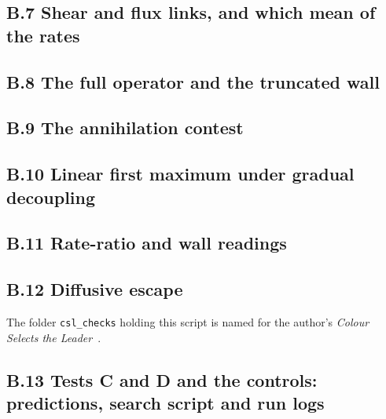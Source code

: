 \documentclass[11pt]{article}
\begin{document}
\subsection*{B.7 Shear and flux links, and which mean of the rates}




\subsection*{B.8 The full operator and the truncated wall}


\subsection*{B.9 The annihilation contest}


\subsection*{B.10 Linear first maximum under gradual decoupling}



\subsection*{B.11 Rate-ratio and wall readings}




\subsection*{B.12 Diffusive escape}\noindent The folder \texttt{csl\_checks} holding this script is named for the author's \emph{Colour Selects the Leader}~\cite{CSL}.\par


\subsection*{B.13 Tests C and D and the controls: predictions, search script and run logs}








\end{document}
